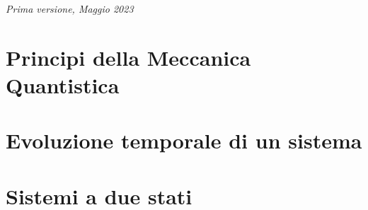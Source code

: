 \documentclass[11pt,fleqn]{book} %
\begin{document}
\noindent \textit{Prima versione, Maggio 2023} %




\pagestyle{empty} %

\tableofcontents %

\cleardoublepage %

\pagestyle{fancy} %



\chapter{Principi della Meccanica Quantistica}





\chapter{Evoluzione temporale di un sistema}




\chapter{Sistemi a due stati}



\end{document}
